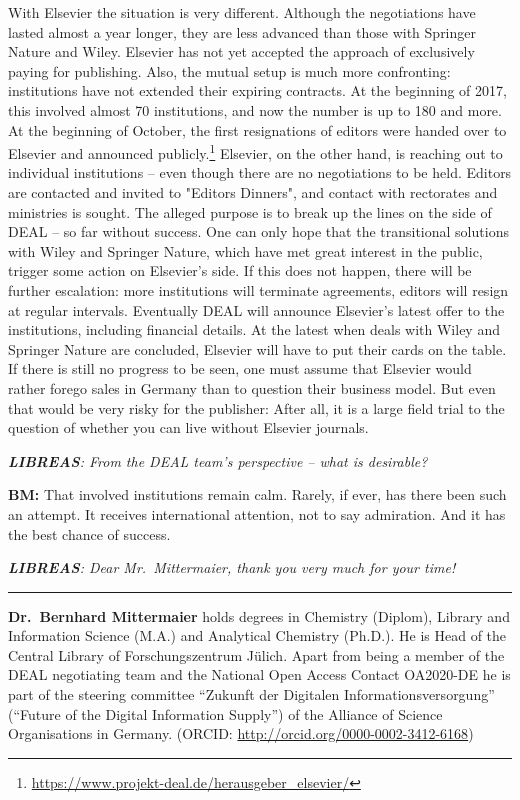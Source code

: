 \documentclass[a4paper,
fontsize=11pt,
oneside,
numbers=noperiodatend,
parskip=half-,
bibliography=totoc,
final
]{scrartcl}
\begin{document}
With Elsevier the situation is very different. Although the negotiations
have lasted almost a year longer, they are less advanced than those with
Springer Nature and Wiley. Elsevier has not yet accepted the approach of
exclusively paying for publishing. Also, the mutual setup is much more
confronting: institutions have not extended their expiring contracts. At
the beginning of 2017, this involved almost 70 institutions, and now the
number is up to 180 and more. At the beginning of October, the first
resignations of editors were handed over to Elsevier and announced
publicly.\footnote{\url{https://www.projekt-deal.de/herausgeber_elsevier/}}
Elsevier, on the other hand, is reaching out to individual institutions
-- even though there are no negotiations to be held. Editors are
contacted and invited to "Editors Dinners", and contact with rectorates
and ministries is sought. The alleged purpose is to break up the lines
on the side of DEAL -- so far without success. One can only hope that
the transitional solutions with Wiley and Springer Nature, which have
met great interest in the public, trigger some action on Elsevier's
side. If this does not happen, there will be further escalation: more
institutions will terminate agreements, editors will resign at regular
intervals. Eventually DEAL will announce Elsevier's latest offer to the
institutions, including financial details. At the latest when deals with
Wiley and Springer Nature are concluded, Elsevier will have to put their
cards on the table. If there is still no progress to be seen, one must
assume that Elsevier would rather forego sales in Germany than to
question their business model. But even that would be very risky for the
publisher: After all, it is a large field trial to the question of
whether you can live without Elsevier journals.

\emph{\textbf{LIBREAS}: From the DEAL team's perspective -- what is
desirable?}

\textbf{BM:} That involved institutions remain calm. Rarely, if ever,
has there been such an attempt. It receives international attention, not
to say admiration. And it has the best chance of success.

\emph{\textbf{LIBREAS}: Dear Mr.~Mittermaier, thank you very much for
your time!}

\begin{center}\rule{0.5\linewidth}{\linethickness}\end{center}

\textbf{Dr.~Bernhard Mittermaier} holds degrees in Chemistry (Diplom),
Library and Information Science (M.A.) and Analytical Chemistry (Ph.D.).
He is Head of the Central Library of Forschungszentrum Jülich. Apart
from being a member of the DEAL negotiating team and the National Open
Access Contact OA2020-DE he is part of the steering committee ``Zukunft
der Digitalen Informationsversorgung'' (``Future of the Digital
Information Supply'') of the Alliance of Science Organisations in
Germany. (ORCID: \url{http://orcid.org/0000-0002-3412-6168})
\end{document}
